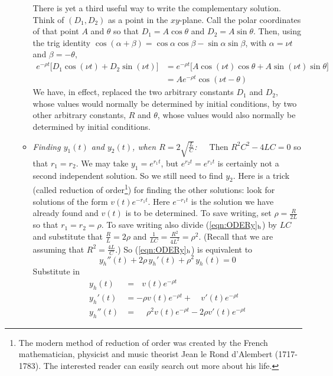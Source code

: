 \begin{eg}
\begin{itemize}
\begin{itemize}
There is yet a third useful way to write 
the complementary solution.
Think of $(D_1,D_2)$ as a point in the $xy$-plane. Call the polar
coordinates of that point $A$ and $\theta$ so that $D_1=A\cos\theta$ and 
$D_2=A\sin\theta$. Then, using the trig identity $\cos(\alpha+\beta)
=\cos \alpha\cos\beta-\sin \alpha\sin \beta$, with $\alpha=\nu t$ and $\beta=-\theta$,
\begin{equation}\label{eqn:RLCampPhase}
\begin{split}
e^{-\rho t}\big[D_1\cos(\nu t)+D_2\sin(\nu t)\big]
&=e^{-\rho t}\big[A\cos(\nu t)\cos\theta+A\sin(\nu t)\sin\theta\big]\\
&=Ae^{-\rho t}\cos(\nu t-\theta)
\end{split}
\end{equation}
We have, in effect, replaced the two arbitrary constants $D_1$ and $D_2$,
whose values would normally be determined by initial conditions, by two
other arbitrary constants, $R$ and $\theta$, whose values would also normally 
be determined by initial conditions. 
\smallskip%
\item 
\emph{Finding $y_1(t)$ and $y_2(t)$, when $R=2\sqrt{\frac{L}{C}}$:}\ \ \ 
Then $R^2C^2-4LC=0$ so that $r_1=r_2$. We may take
$y_1=e^{r_1t}$, but $e^{r_2t}=e^{r_1t}$ is certainly not a second independent
solution. So we still need to find $y_2$.  
Here is a trick (called reduction of order\footnote{The modern method of reduction of order was created by the French mathematician, physicist 
and music theorist Jean le Rond d'Alembert (1717-1783). The interested reader
can easily search out more about his life.}) for finding 
the other solutions:
look for solutions of the form  $v(t)e^{-r_1 t}$. Here $e^{-r_1 t}$
is the solution we have already found and $v(t)$ is to be determined.
To save writing, set $\rho=\frac{R}{2L}$ so that $r_1=r_2=\rho$.
To save writing also divide (\ref{eqn:ODERy}$_{\rm h}$) by $LC$ and 
substitute that $\frac{R}{L}=2\rho$ and  
$\frac{1}{LC}=\frac{R^2}{4L^2}=\rho^2$.  (Recall that we are assuming 
that $R^2=\frac{4L}{C}$.) So (\ref{eqn:ODERy}$_{\rm h}$) is equivalent to
\begin{equation*}
y_h''(t)+2\rho\,y_h'(t)+\rho^2\,y_h(t)=0
\end{equation*}
Substitute in 
\begin{align*}
y_h(t)&=\ \ \  v(t)e^{-\rho t}\\
y_h'(t)&= -\rho v(t)e^{-\rho t}+\phantom{2\rho}v'(t)e^{-\rho t}\\
y_h''(t)&= \phantom{-}\rho^2 v(t)e^{-\rho t}-2\rho v'(t)e^{-\rho t}

\end{align*}
\end{itemize}
\end{itemize}
\end{eg}
